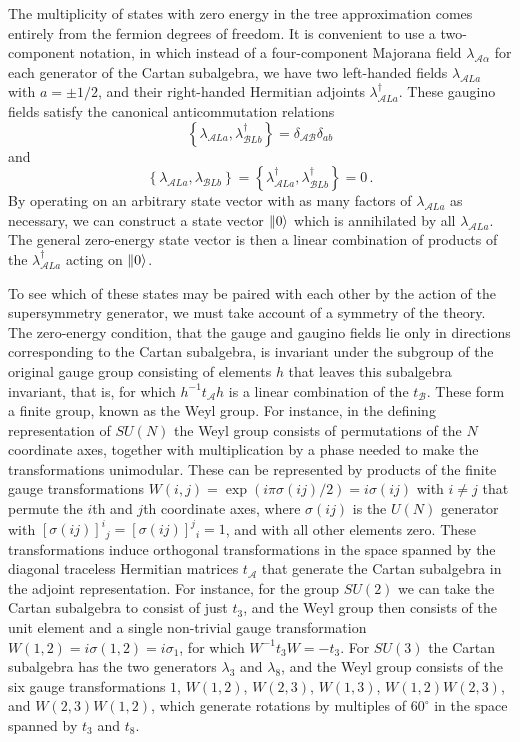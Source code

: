 The multiplicity of states with zero energy in the tree approximation comes
entirely from the fermion degrees of freedom. It is convenient to use a
two-component notation, in which instead of a four-component Majorana field
\(\lambda_{\mathcal A\alpha}\) for each generator of the Cartan subalgebra,
we have two left-handed fields \(\lambda_{\mathcal A La}\) with
\(a=\pm1/2\), and their right-handed Hermitian adjoints
\(\lambda_{\mathcal A La}^\dagger\). These gaugino fields satisfy the canonical
anticommutation relations
\[
  \left\{
    \lambda_{\mathcal A La},\lambda_{\mathcal B Lb}^\dagger
  \right\}
  =\delta_{\mathcal A\mathcal B}\delta_{ab}
\]
and
\[
  \left\{
    \lambda_{\mathcal A La},\lambda_{\mathcal B Lb}
  \right\}
  =
  \left\{
    \lambda_{\mathcal A La}^\dagger,\lambda_{\mathcal B Lb}^\dagger
  \right\}
  =0\,.
\]
By operating on an arbitrary state vector with as many factors of
\(\lambda_{\mathcal A La}\) as necessary, we can construct a state vector
\(\lVert 0\rangle\) which is annihilated by all \(\lambda_{\mathcal A La}\). The
general zero-energy state vector is then a linear combination of products
of the \(\lambda_{\mathcal A La}^\dagger\) acting on \(\lVert 0\rangle\).

To see which of these states may be paired with each other by the action of
the supersymmetry generator, we must take account of a symmetry of the
theory. The zero-energy condition, that the gauge and gaugino fields lie
only in directions corresponding to the Cartan subalgebra, is invariant
under the subgroup of the original gauge group consisting of elements
\(h\) that leaves this subalgebra invariant, that is, for which
\(h^{-1}t_{\mathcal A}h\) is a linear combination of the
\(t_{\mathcal B}\). These form a finite group, known as the Weyl group.
For instance, in the defining representation of \(SU(N)\) the Weyl group
consists of permutations of the \(N\) coordinate axes, together with
multiplication by a phase needed to make the transformations unimodular.
These can be represented by products of the finite gauge transformations
\(W(i,j)=\exp(i\pi\sigma(ij)/2)=i\sigma(ij)\) with \(i\neq j\) that
permute the \(i\)th and \(j\)th coordinate axes, where \(\sigma(ij)\) is
the \(U(N)\) generator with
\([\sigma(ij)]^i{}_j=[\sigma(ij)]^j{}_i=1\), and with all other elements
zero. These transformations induce orthogonal transformations in the space
spanned by the diagonal traceless Hermitian matrices \(t_{\mathcal A}\)
that generate the Cartan subalgebra in the adjoint representation. For
instance, for the group \(SU(2)\) we can take the Cartan subalgebra to
consist of just \(t_3\), and the Weyl group then consists of the unit
element and a single non-trivial gauge transformation
\(W(1,2)=i\sigma(1,2)=i\sigma_1\), for which
\(W^{-1}t_3W=-t_3\). For \(SU(3)\) the Cartan subalgebra has the two
generators \(\lambda_3\) and \(\lambda_8\), and the Weyl group consists of the six
gauge transformations \(1\), \(W(1,2)\), \(W(2,3)\), \(W(1,3)\),
\(W(1,2)W(2,3)\), and \(W(2,3)W(1,2)\), which generate rotations by
multiples of \(60^\circ\) in the space spanned by \(t_3\) and \(t_8\).

